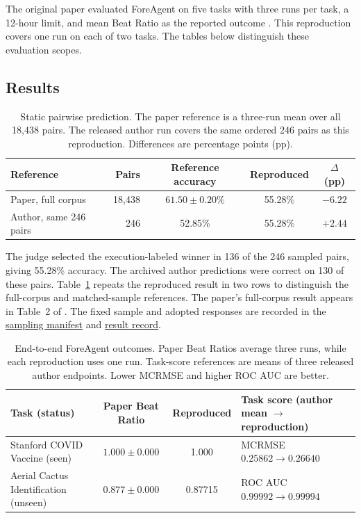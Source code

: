 The original paper evaluated ForeAgent on five tasks with three runs per task, a 12-hour limit, and mean Beat Ratio as the reported outcome \citep[Section~6.3]{zheng2026predict}. This reproduction covers one run on each of two tasks. The tables below distinguish these evaluation scopes.

\subsection{Results}
\begin{table}[H]
\centering\small
\caption{Static pairwise prediction. The paper reference is a three-run mean over all 18,438 pairs. The released author run covers the same ordered 246 pairs as this reproduction. Differences are percentage points (pp).}
\label{tab:repro-pairwise}
\begin{tabular}{p{3.3cm}rccc}
\toprule
Reference & Pairs & Reference accuracy & Reproduced & $\Delta$ (pp) \\
\midrule
Paper, full corpus & 18,438 & $61.50\pm0.20\%$ & 55.28\% & $-6.22$ \\
Author, same 246 pairs & 246 & 52.85\% & 55.28\% & $+2.44$ \\
\bottomrule
\end{tabular}
\end{table}

The judge selected the execution-labeled winner in 136 of the 246 sampled pairs, giving 55.28\% accuracy. The archived author predictions were correct on 130 of these pairs. Table~\ref{tab:repro-pairwise} repeats the reproduced result in two rows to distinguish the full-corpus and matched-sample references. The paper's full-corpus result appears in Table~2 of \citet{zheng2026predict}. The fixed sample and adopted responses are recorded in the \href{https://github.com/skyexry/foreagent-reproduction/blob/a80ae9cb0ea15a6f2c3d5666528a01a3006009c5/experiments/coverage_manifest.json}{sampling manifest} and \href{https://github.com/skyexry/foreagent-reproduction/blob/a80ae9cb0ea15a6f2c3d5666528a01a3006009c5/experiments/coverage_retry_results.json}{result record}.

\begin{table}[H]
\centering\small
\caption{End-to-end ForeAgent outcomes. Paper Beat Ratios average three runs, while each reproduction uses one run. Task-score references are means of three released author endpoints. Lower MCRMSE and higher ROC AUC are better.}
\label{tab:repro-system}
\begin{tabular}{>{\raggedright\arraybackslash}p{3.6cm}cc>{\raggedright\arraybackslash}p{3.3cm}}
\toprule
Task (status) & Paper Beat Ratio & Reproduced & Task score (author mean $\rightarrow$ reproduction) \\
\midrule
Stanford COVID Vaccine (seen) & $1.000\pm0.000$ & 1.000 & MCRMSE\newline $0.25862\rightarrow0.26640$ \\
Aerial Cactus Identification (unseen) & $0.877\pm0.000$ & 0.87715 & ROC AUC\newline $0.99992\rightarrow0.99994$ \\
\bottomrule
\end{tabular}
\end{table}

